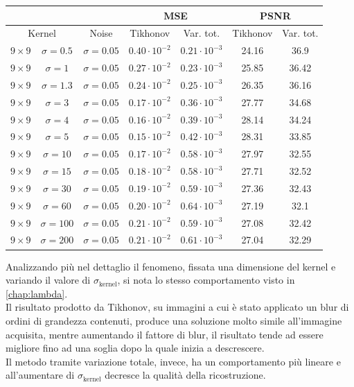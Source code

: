 \documentclass[11pt]{article}
\begin{document}
\begin{center}
    \begin{tabular}{ |cc|c|c|c|c|c| }
    \hline
    & & & \multicolumn{2}{c|}{MSE} & \multicolumn{2}{c|}{PSNR} \\
    \hline
    \multicolumn{2}{|c|}{Kernel} & Noise & Tikhonov & Var. tot. & Tikhonov & Var. tot. \\ 
    \hline
    $9 \times 9$ & $\sigma=0.5$ & $\sigma=0.05$ & $0.40 \cdot 10^{-2}$ & $0.21 \cdot 10^{-3}$ & 24.16 & 36.9 \\
	$9 \times 9$ & $\sigma=1$ & $\sigma=0.05$ & $0.27 \cdot 10^{-2}$ & $0.23 \cdot 10^{-3}$ & 25.85 & 36.42 \\
	$9 \times 9$ & $\sigma=1.3$ & $\sigma=0.05$ & $0.24 \cdot 10^{-2}$ & $0.25 \cdot 10^{-3}$ & 26.35 & 36.16 \\
    $9 \times 9$ & $\sigma=3$ & $\sigma=0.05$ & $0.17 \cdot 10^{-2}$ & $0.36 \cdot 10^{-3}$ & 27.77 & 34.68 \\
    $9 \times 9$ & $\sigma=4$ & $\sigma=0.05$ & $0.16 \cdot 10^{-2}$ & $0.39 \cdot 10^{-3}$ & 28.14 & 34.24 \\
    $9 \times 9$ & $\sigma=5$ & $\sigma=0.05$ & $0.15 \cdot 10^{-2}$ & $0.42 \cdot 10^{-3}$ & 28.31 & 33.85 \\
    $9 \times 9$ & $\sigma=10$ & $\sigma=0.05$ & $0.17 \cdot 10^{-2}$ & $0.58 \cdot 10^{-3}$ & 27.97 & 32.55 \\
    $9 \times 9$ & $\sigma=15$ & $\sigma=0.05$ & $0.18 \cdot 10^{-2}$ & $0.58 \cdot 10^{-3}$ & 27.71 & 32.52 \\
    $9 \times 9$ & $\sigma=30$ & $\sigma=0.05$ & $0.19 \cdot 10^{-2}$ & $0.59 \cdot 10^{-3}$ & 27.36 & 32.43 \\
    $9 \times 9$ & $\sigma=60$ & $\sigma=0.05$ & $0.20 \cdot 10^{-2}$ & $0.64 \cdot 10^{-3}$ & 27.19 & 32.1 \\
    $9 \times 9$ & $\sigma=100$ & $\sigma=0.05$ & $0.21 \cdot 10^{-2}$ & $0.59 \cdot 10^{-3}$ & 27.08 & 32.42 \\
	$9 \times 9$ & $\sigma=200$ & $\sigma=0.05$ & $0.21 \cdot 10^{-2}$ & $0.61 \cdot 10^{-3}$ & 27.04 & 32.29 \\
	\hline
    \end{tabular}
\end{center}

Analizzando più nel dettaglio il fenomeno, fissata una dimensione del kernel e variando il valore di $\sigma_{\text{kernel}}$, si nota lo stesso comportamento visto in \autoref{chap:lambda}.\\
Il risultato prodotto da Tikhonov, su immagini a cui è stato applicato un blur di ordini di grandezza contenuti, produce una soluzione molto simile all'immagine acquisita, 
mentre aumentando il fattore di blur, il risultato tende ad essere migliore fino ad una soglia dopo la quale inizia a descrescere.\\
Il metodo tramite variazione totale, invece, ha un comportamento più lineare e all'aumentare di $\sigma_{\text{kernel}}$ decresce la qualità della ricostruzione.
\end{document}

